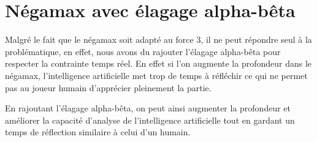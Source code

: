 \section{Négamax avec élagage alpha-bêta}

Malgré le fait que le négamax soit adapté au force 3, il ne peut répondre seul à
la problématique, en effet, nous avons du rajouter l'élagage alpha-bêta pour
respecter la contrainte temps réel. En effet si l'on augmente la profondeur dans
le négamax, l'intelligence artificielle met trop de temps à réfléchir ce qui ne
permet pas au joueur humain d'apprécier pleinement la partie.

En rajoutant l'élagage alpha-bêta, on peut ainsi augmenter la profondeur et
améliorer la capacité d'analyse de l'intelligence artificielle tout en gardant
un temps de réflection similaire à celui d'un humain.

